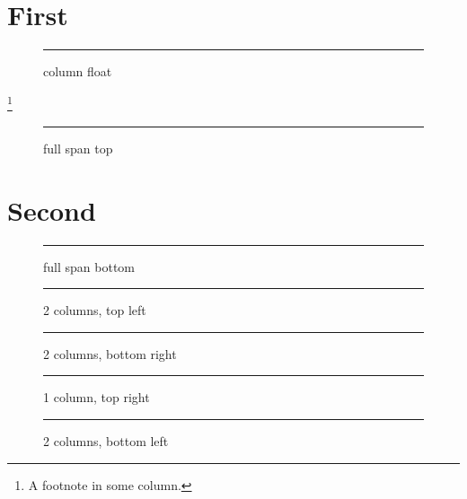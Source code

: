 \documentclass{article}
\begin{document}
\section{First}
\lipsum[1-4]
\begin{figure}[t]\centering\rule{.8\linewidth}{2cm}\caption{column float}\end{figure}
\lipsum[5-7]\footnote{A footnote in some column.}
\begin{figure}[t]\centering\rule{.8\linewidth}{3cm}\caption{full span top}\end{figure}
\section{Second}
\lipsum[8-14]
\begin{figure}[b]\centering\rule{.8\linewidth}{2cm}\caption{full span bottom}\end{figure}
\lipsum[15-22]
\begin{figure}[span=2,at=tl]\centering\rule{.8\linewidth}{3cm}\caption{2 columns, top left}\end{figure}
\begin{figure}[span=2,at=br]\centering\rule{.8\linewidth}{3cm}\caption{2 columns, bottom right}\end{figure}
\lipsum[23-40]
\begin{figure}[span=1,at=tr]\centering\rule{.8\linewidth}{3cm}\caption{1 column, top right}\end{figure}
\begin{figure}[span=2,at=bl]\centering\rule{.8\linewidth}{3cm}\caption{2 columns, bottom left}\end{figure}
\lipsum[41-60]
\lipsum[1-6]
\lipsum[7-20]
\end{document}
